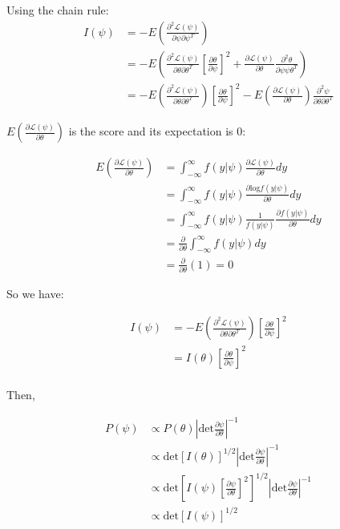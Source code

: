 \documentclass[11pt]{article}
\begin{document}
Using the chain rule:
\begin{align*}
    I(\psi) &= -E\left(\frac{\partial ^2\mathcal{L}(\psi)}{\partial \psi \partial \psi^T}\right)\\
    &= -E\left(\frac{\partial^2\mathcal{L}(\psi)}{\partial \theta \partial \theta^T} \left[\frac{\partial \theta}{\partial \psi}\right]^2 + \frac{\partial \mathcal{L}(\psi)}{\partial \theta} \frac{\partial ^2\theta}{\partial \psi \psi \theta^T}\right)\\
     &= -E\left(\frac{\partial^2\mathcal{L}(\psi)}{\partial \theta \partial \theta^T}\right)\left[\frac{\partial \theta}{\partial \psi}\right]^2  -E\left(\frac{\partial \mathcal{L}(\psi)}{\partial \theta} \right)\frac{\partial ^2\psi}{\partial \theta \partial \theta^T}
\end{align*}

$E\left(\frac{\partial \mathcal{L}(\psi)}{\partial \theta} \right)$ is the score and its expectation is 0:

\begin{align*}
    E\left(\frac{\partial \mathcal{L}(\psi)}{\partial \theta} \right) &= \int^{\infty}_{-\infty} f(y|\psi)  \frac{\partial \mathcal{L}(\psi)}{\partial \theta} dy\\
    &= \int^{\infty}_{-\infty} f(y|\psi)  \frac{\partial \text{log}f(y|\psi) }{\partial \theta} dy\\
    &= \int^{\infty}_{-\infty} f(y|\psi) \frac{1}{f(y|\psi) }  \frac{\partial f(y|\psi) }{\partial \theta} dy\\
     &= \frac{\partial }{\partial \theta} \int^{\infty}_{-\infty}f(y|\psi) dy \\
     & = \frac{\partial }{\partial \theta} (1) = 0
\end{align*}

So we have:

\begin{align*}
    I(\psi) &=-E\left(\frac{\partial^2\mathcal{L}(\psi)}{\partial \theta \partial \theta^T}\right)\left[\frac{\partial \theta}{\partial \psi}\right]^2  \\
    &= I(\theta) \left[\frac{\partial \theta}{\partial \psi}\right]^2\\
\end{align*}

Then, 

\begin{align*}
    P(\psi) &\propto P(\theta) \left|\text{det}\frac{\partial \psi}{\partial \theta}\right|^{-1}\\
    &\propto \text{det}[I(\theta)]^{1/2}\left|\text{det}\frac{\partial \psi}{\partial \theta}\right|^{-1}\\
     &\propto \text{det}\left[I(\psi)\left[\frac{\partial \psi}{\partial \theta}\right]^2\right]^{1/2}\left|\text{det}\frac{\partial \psi}{\partial \theta}\right|^{-1}\\
     &\propto \text{det}[I(\psi)]^{1/2}
\end{align*}
\end{document}
